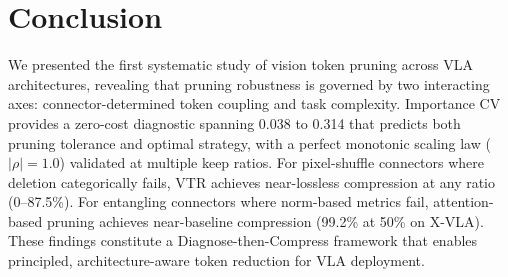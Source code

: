 \documentclass[10pt,letterpaper]{article}
\begin{document}
\section{Conclusion}
\label{sec:conclusion}

We presented the first systematic study of vision token pruning across VLA architectures, revealing that pruning robustness is governed by two interacting axes: connector-determined token coupling and task complexity. Importance CV provides a zero-cost diagnostic spanning 0.038 to 0.314 that predicts both pruning tolerance and optimal strategy, with a perfect monotonic scaling law ($|\rho|\!=\!1.0$) validated at multiple keep ratios. For pixel-shuffle connectors where deletion categorically fails, VTR achieves near-lossless compression at any ratio (0--87.5\%). For entangling connectors where norm-based metrics fail, attention-based pruning achieves near-baseline compression (99.2\% at 50\% on X-VLA). These findings constitute a Diagnose-then-Compress framework that enables principled, architecture-aware token reduction for VLA deployment.
\end{document}
